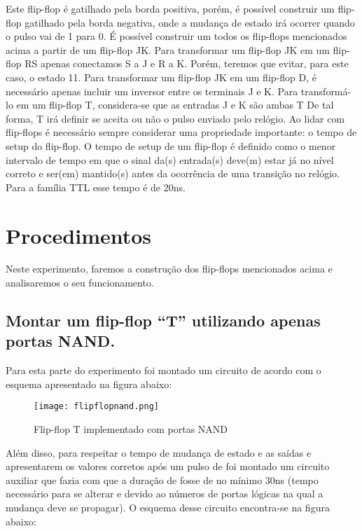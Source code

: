 \documentclass[12pt]{article}
\begin{document}
Este flip-flop é gatilhado pela borda positiva, porém, é possível construir um flip-flop gatilhado pela borda negativa, onde a mudança de estado irá ocorrer quando o pulso vai de 1 para 0.
É possível construir um todos os flip-flops mencionados acima a partir de um flip-flop JK. Para transformar um flip-flop JK em um flip-flop RS apenas conectamos S a J e R a K. Porém, teremos que evitar, para este caso, o estado 11. Para transformar um flip-flop JK em um flip-flop D, é necessário apenas incluir um inversor entre os terminais J e K. Para transformá-lo em um flip-flop T, considera-se que as entradas J e K são ambas T De tal forma, T irá definir se aceita ou não o pulso enviado pelo relógio.
Ao lidar com flip-flops é necessário sempre considerar uma propriedade importante: o tempo de setup do flip-flop. O tempo de setup de um flip-flop é definido como o menor intervalo de tempo em que o sinal da(s) entrada(s) deve(m) estar já no nível correto e ser(em) mantido(s) antes da ocorrência de uma transição no relógio.  Para a família TTL esse tempo é de 20ns.

\section{Procedimentos}
\label{sec:Procedimentos}

Neste experimento, faremos a construção dos flip-flops mencionados acima e analisaremos o seu funcionamento.

\subsection{Montar um flip-flop “T” utilizando apenas portas NAND.}
\label{2.1}
Para esta parte do experimento foi montado um circuito de acordo com o esquema apresentado na figura abaixo:

\begin{figure}[H]
	\centering
	\texttt{[image: flipflopnand.png]}
	\caption{Flip-flop T implementado com portas NAND}
	\label{fig:flipfloptexp}
\end{figure}	

Além disso, para respeitar o tempo de mudança de estado e as saídas  e  apresentarem os valores corretos após um pulso de  foi montado um circuito auxiliar que fazia com que a duração de  fosse de no mínimo 30ns (tempo necessário para se alterar  e  devido ao números de portas lógicas na qual a mudança deve se propagar). O esquema desse circuito encontra-se na figura abaixo:
\end{document}
